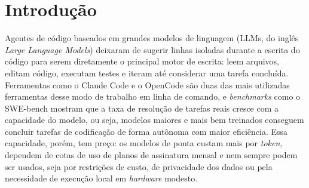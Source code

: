 
\section{Introdução}
\label{sec:introducao}

Agentes de código baseados em grandes modelos de linguagem (LLMs, do inglês
\textit{Large Language Models}) deixaram de sugerir linhas isoladas durante
a escrita do código para serem diretamente o principal motor de escrita:
leem arquivos, editam código, executam
testes e iteram até considerar uma tarefa concluída. Ferramentas como o Claude
Code \cite{anthropic2025claudecode} e o OpenCode \cite{opencode2025docs}
são duas das mais utilizadas ferramentas desse modo de trabalho em linha de comando, e \textit{benchmarks}
como o SWE-bench \cite{jimenez2024swebench} mostram que a taxa de resolução de
tarefas reais cresce com a capacidade do modelo, ou seja, modelos maiores e mais bem treinados conseguem concluir tarefas de codificação de forma autônoma com maior eficiência. Essa capacidade, porém, tem
preço: os modelos de ponta custam mais por \textit{token}, dependem de cotas de
uso de planos de assinatura mensal e nem sempre podem ser usados, seja por restrições de custo, de
privacidade dos dados ou pela necessidade de execução local em
\textit{hardware} modesto.

